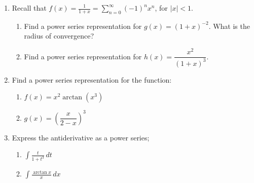 \documentclass[12pt]{article}
\newcommand{\di}{\displaystyle}
\newcommand{\abs}[1]{\lvert #1\rvert}
\begin{document}
\begin{enumerate}
\vspace{1.5in}

\item Recall that $f(x) =\frac{1}{1+x} = \sum_{n=0}^\infty (-1)^nx^n$, for $\abs{x}<1$.
\begin{enumerate}
\item Find a power series representation for $g(x)=(1+x)^{-2}$. What is the radius of convergence?

\vspace{1in}

\item Find a power series representation for $h(x) = \dfrac{x^2}{(1+x)^3}$.
\end{enumerate}
\newpage

\item Find a power series representation for the function:
\begin{enumerate}
\item $f(x) = x^2\arctan(x^3)$

\vspace{1.5in}

\item $g(x) = \left(\dfrac{x}{2-x}\right)^3$
\end{enumerate}

\vspace{1.5in}

\item Express the antiderivative as a power series;
\begin{enumerate}
\item $\di\int\frac{t}{1+t^3}\,dt$

\vspace{1.5in}

\item $\di \int \frac{\arctan{x}}{x}\,dx$
\end{enumerate}
\end{enumerate}
\end{document}
